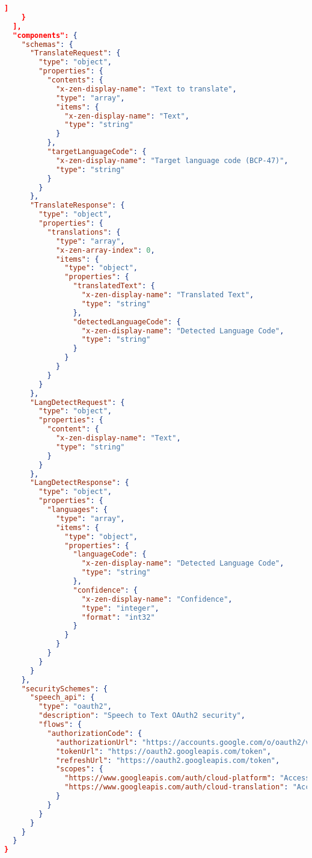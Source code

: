 \begin{lstlisting}[language=json,basicstyle=\ttfamily\tiny,numberstyle=\tiny]
      ]
    }
  ],
  "components": {
    "schemas": {
      "TranslateRequest": {
        "type": "object",
        "properties": {
          "contents": {
            "x-zen-display-name": "Text to translate",
            "type": "array",
            "items": {
              "x-zen-display-name": "Text",
              "type": "string"
            }
          },
          "targetLanguageCode": {
            "x-zen-display-name": "Target language code (BCP-47)",
            "type": "string"
          }
        }
      },
      "TranslateResponse": {
        "type": "object",
        "properties": {
          "translations": {
            "type": "array",
            "x-zen-array-index": 0,
            "items": {
              "type": "object",
              "properties": {
                "translatedText": {
                  "x-zen-display-name": "Translated Text",
                  "type": "string"
                },
                "detectedLanguageCode": {
                  "x-zen-display-name": "Detected Language Code",
                  "type": "string"
                }
              }
            }
          }
        }
      },
      "LangDetectRequest": {
        "type": "object",
        "properties": {
          "content": {
            "x-zen-display-name": "Text",
            "type": "string"
          }
        }
      },
      "LangDetectResponse": {
        "type": "object",
        "properties": {
          "languages": {
            "type": "array",
            "items": {
              "type": "object",
              "properties": {
                "languageCode": {
                  "x-zen-display-name": "Detected Language Code",
                  "type": "string"
                },
                "confidence": {
                  "x-zen-display-name": "Confidence",
                  "type": "integer",
                  "format": "int32"
                }
              }
            }
          }
        }
      }
    },
    "securitySchemes": {
      "speech_api": {
        "type": "oauth2",
        "description": "Speech to Text OAuth2 security",
        "flows": {
          "authorizationCode": {
            "authorizationUrl": "https://accounts.google.com/o/oauth2/v2/auth",
            "tokenUrl": "https://oauth2.googleapis.com/token",
            "refreshUrl": "https://oauth2.googleapis.com/token",
            "scopes": {
              "https://www.googleapis.com/auth/cloud-platform": "Access cloud platform",
              "https://www.googleapis.com/auth/cloud-translation": "Access cloud translation"
            }
          }
        }
      }
    }
  }
}
\end{lstlisting}
